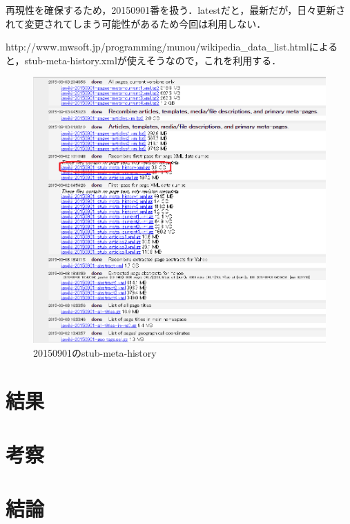 再現性を確保するため，20150901番を扱う．latestだと，最新だが，日々更新されて変更されてしまう可能性があるため今回は利用しない．


http://www.mwsoft.jp/programming/munou/wikipedia\_data\_list.htmlによると，stub-meta-history.xmlが使えそうなので，これを利用する．

\begin{figure}[H]
\centering
\includegraphics[width=14cm]{wiki20150901.PNG}
\caption{20150901のstub-meta-history}\label{サンプル図}
\end{figure}



\chapter{結果}

\chapter{考察}

\chapter{結論}

